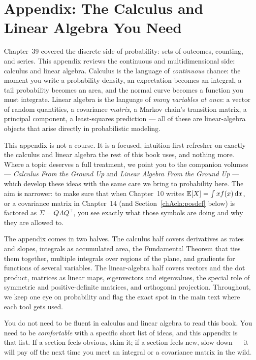 \chapter{Appendix: The Calculus and Linear Algebra You Need}
\label{chAcla:start}

Chapter~39 covered the discrete side of probability: sets of outcomes,
counting, and series. This appendix reviews the continuous and
multidimensional side: calculus and linear algebra. Calculus is the
language of \emph{continuous} chance: the moment you write a probability density, an expectation
becomes an integral, a tail probability becomes an area, and the normal curve becomes a function you
must integrate. Linear algebra is the language of \emph{many variables at once}: a vector
of random quantities, a covariance \emph{matrix}, a Markov chain's transition matrix, a principal
component, a least-squares prediction --- all of these are linear-algebra objects that arise
directly in probabilistic modeling.

This appendix is not a course. It is a focused, intuition-first refresher on exactly the calculus and
linear algebra the rest of this book uses, and nothing more. Where a topic deserves a full treatment,
we point you to the companion volumes --- \emph{Calculus From the Ground Up} and \emph{Linear Algebra
From the Ground Up} --- which develop these ideas with the same care we bring to probability here. The
aim is narrower: to make sure that when Chapter~10 writes $\operatorname{\mathbb{E}}[X]=\int x f(x)\,\mathrm{d} x$,
or a covariance matrix in Chapter~14 (and Section~\ref{chAcla:posdef} below) is factored as $\Sigma = Q \Lambda Q^\top$, you see exactly what
those symbols are doing and why they are allowed to.

The appendix comes in two halves. The calculus half covers derivatives as rates and slopes, integrals
as accumulated area, the Fundamental Theorem that ties them together, multiple integrals over regions
of the plane, and gradients for functions of several variables. The linear-algebra half covers vectors
and the dot product, matrices as linear maps, eigenvectors and eigenvalues, the special role of
symmetric and positive-definite matrices, and orthogonal projection. Throughout, we keep one eye on
probability and flag the exact spot in the main text where each tool gets used.

\begin{focusbox}
You do not need to be fluent in calculus and linear algebra to read this book. You need to be
\emph{comfortable} with a specific short list of ideas, and this appendix is that list. If a section
feels obvious, skim it; if a section feels new, slow down --- it will pay off the next time you meet
an integral or a covariance matrix in the wild.
\end{focusbox}

